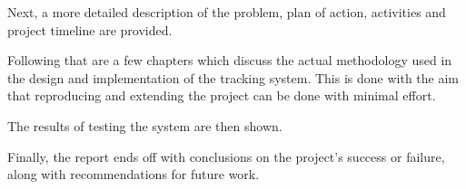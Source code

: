Next, a more detailed description of the problem, plan of action, activities and project timeline are provided.

Following that are a few chapters which discuss the actual methodology used in the design and implementation of the tracking system. This is done with the aim that reproducing and extending the project can be done with minimal effort.

The results of testing the system are then shown.

Finally, the report ends off with conclusions on the project's success or failure, along with recommendations for future work.
